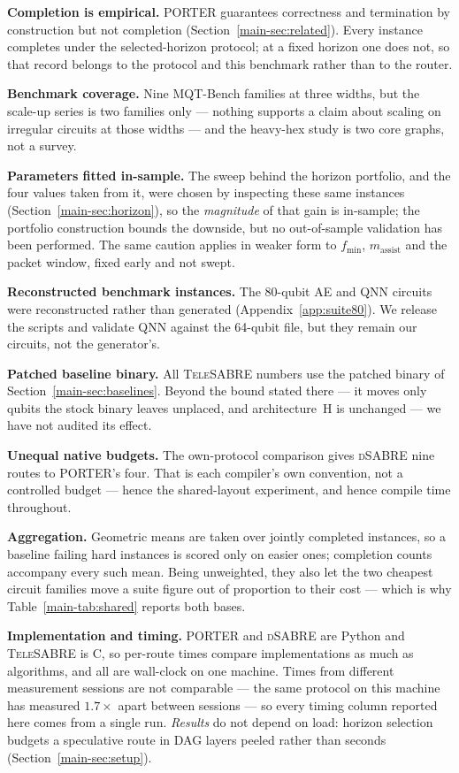 \documentclass[journal]{IEEEtran}
\newcommand{\PORTER}{\textsc{PORTER}}
\newcommand{\TeleSABRE}{\textsc{TeleSABRE}}
\newcommand{\dSABRE}{\textsc{dSABRE}}
\newcommand{\mainSetup}{Section~\ref{main-sec:setup}}
\newcommand{\mainSharedTable}{Table~\ref{main-tab:shared}}
\newcommand{\mainHorizon}{Section~\ref{main-sec:horizon}}
\newcommand{\mainRelated}{Section~\ref{main-sec:related}}
\newcommand{\mainBaselines}{Section~\ref{main-sec:baselines}}
\begin{document}
\textbf{Completion is empirical.} \PORTER{} guarantees correctness and
termination by construction but not completion (\mainRelated{}). Every
instance completes under the selected-horizon protocol; at a fixed horizon
one does not, so that record belongs to the protocol and this benchmark
rather than to the router.

\textbf{Benchmark coverage.} Nine MQT-Bench families at three widths, but
the scale-up series is two families only --- nothing supports a claim about
scaling on irregular circuits at those widths --- and the heavy-hex study
is two core graphs, not a survey.

\textbf{Parameters fitted in-sample.} The sweep behind the horizon
portfolio, and the four values taken from it, were chosen by inspecting
these same instances (\mainHorizon{}), so the \emph{magnitude} of that
gain is in-sample; the
portfolio construction bounds the downside, but no out-of-sample
validation has been performed. The same caution applies in weaker form to
$f_\mathrm{min}$, $m_\mathrm{assist}$ and the packet window, fixed early
and not swept.

\textbf{Reconstructed benchmark instances.} The 80-qubit AE and QNN
circuits were reconstructed rather than generated
(Appendix~\ref{app:suite80}). We release the scripts and validate QNN
against the 64-qubit file, but they remain our circuits, not the
generator's.

\textbf{Patched baseline binary.} All \TeleSABRE{} numbers use the patched
binary of \mainBaselines{}. Beyond the bound stated there --- it moves only
qubits the stock binary leaves unplaced, and architecture~H is unchanged
--- we have not audited its effect.

\textbf{Unequal native budgets.} The own-protocol comparison gives
\dSABRE{} nine routes to \PORTER{}'s four. That is each compiler's own
convention, not a controlled budget --- hence the shared-layout experiment,
and hence compile time throughout.

\textbf{Aggregation.} Geometric means are taken over jointly completed
instances, so a baseline failing hard instances is scored only on easier
ones; completion counts accompany every such mean. Being unweighted, they
also let the two cheapest circuit families move a suite figure out of
proportion to their cost --- which is why \mainSharedTable{} reports both
bases.

\textbf{Implementation and timing.} \PORTER{} and \dSABRE{} are Python and
\TeleSABRE{} is C, so per-route times compare implementations as much as
algorithms, and all are wall-clock on one machine. Times from different
measurement sessions are not comparable --- the same protocol on this
machine has measured $1.7\times$ apart between sessions --- so every timing
column reported here comes from a single run. \emph{Results} do not depend
on load: horizon selection budgets a speculative route in DAG layers peeled
rather than seconds (\mainSetup{}).
\end{document}
